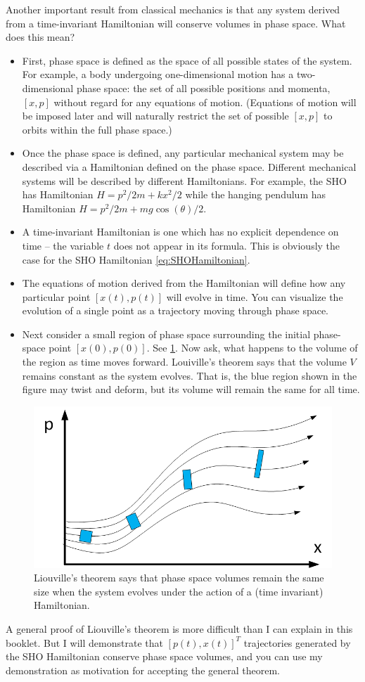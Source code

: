 \documentclass[hidelinks,notitlepage]{book}
\begin{document}
Another important result from classical mechanics is that any system derived from a time-invariant Hamiltonian will conserve volumes in phase space.  What does this mean?  
\begin{itemize}
	\item First, phase space is defined as the space of all possible states of the system.  For example, a body undergoing one-dimensional motion has a two-dimensional phase space: the set of all possible positions and momenta, $[x, p]$ without regard for any equations of motion.  (Equations of motion will be imposed later and will naturally restrict the set of possible $[x, p]$ to orbits within the full phase space.)
	\item Once the phase space is defined, any particular mechanical system may be described via a Hamiltonian defined on the phase space.  Different mechanical systems will be described by different Hamiltonians.  For example, the SHO has Hamiltonian $H = p^2/2m + k x^2/2$ while the hanging pendulum has Hamiltonian $H = p^2/2m + m g \cos(\theta)/2$.
	\item A time-invariant Hamiltonian is one which has no explicit dependence on time -- the variable $t$ does not appear in its formula.  This is obviously the case for the SHO Hamiltonian \cref{eq:SHOHamiltonian}.
	\item The equations of motion derived from the Hamiltonian will define how any particular point $[x(t),p(t)]$ will evolve in time.  You can visualize the evolution of a single point as a trajectory moving through phase space.
	\item Next consider a small region of phase space surrounding the initial phase-space point $[x(0),p(0)]$.  See \cref{fig:PhaseSpaceVolumes}.  Now ask, what happens to the volume of the region as time moves forward.  Louiville's theorem says that the volume $V$ remains constant as the system evolves.  That is, the blue region shown in the figure may twist and deform, but its volume will remain the same for all time.
\end{itemize}
\begin{figure}[ht]
	\centering
	\includegraphics[width=0.7\columnwidth]{PhaseSpaceVolumes.png}
	\caption{Liouville's theorem says that phase space volumes remain the same size when the system evolves under the action of a (time invariant) Hamiltonian.}
	\label{fig:PhaseSpaceVolumes}
\end{figure}
A general proof of Liouville's theorem is more difficult than I can explain in this booklet.  But I will demonstrate that $[p(t), x(t)]^T$ trajectories generated by the SHO Hamiltonian conserve phase space volumes, and you can use my demonstration as motivation for accepting the general theorem.
\end{document}
